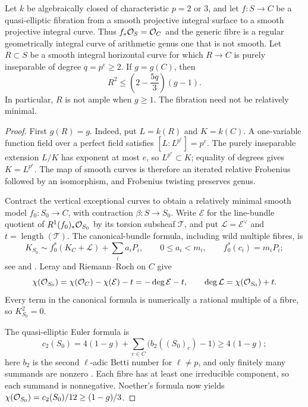\begin{proposition}\label{prop:quasielliptic-multisection}
Let $k$ be algebraically closed of characteristic $p=2$ or $3$, and let
$f:S\to C$ be a quasi-elliptic fibration from a smooth projective integral
surface to a smooth projective integral curve. Thus $f_*\mathcal O_S=\mathcal O_C$ and
the generic fibre is a regular geometrically integral curve of arithmetic
genus one that is not smooth. Let $R\subset S$ be a smooth integral
horizontal curve for which $R\to C$ is purely inseparable of degree
$q=p^e\geq2$. If $g=g(C)$, then
\[
 R^2\leq\left(2-\frac{5q}{3}\right)(g-1).
\]
In particular, $R$ is not ample when $g\geq1$. The fibration need not be
relatively minimal.
\end{proposition}
\begin{proof}
First $g(R)=g$. Indeed, put $L=k(R)$ and $K=k(C)$. A one-variable
function field over a perfect field satisfies $[L:L^{p^e}]=p^e$.
The purely inseparable extension $L/K$ has exponent at most $e$, so
$L^{p^e}\subset K$; equality of degrees gives $K=L^{p^e}$.
The map of smooth curves is therefore an iterated relative Frobenius
followed by an isomorphism, and Frobenius twisting preserves genus.

Contract the vertical exceptional curves to obtain a relatively minimal
smooth model $f_0:S_0\to C$, with contraction $\beta:S\to S_0$.
Write $\mathcal E$ for the line-bundle quotient of
$R^1(f_0)_*\mathcal O_{S_0}$ by its torsion subsheaf $\mathcal T$, and put
$\mathcal L=\mathcal E^\vee$ and $t=\operatorname{length}(\mathcal T)$.
The canonical-bundle formula, including wild multiple fibres, is
\[
 K_{S_0}\sim f_0^*(K_C+\mathcal L)+\sum_i a_iP_i,
 \qquad 0\leq a_i<m_i,\qquad f_0^*(c_i)=m_iP_i;
\]
see \cite[Theorem~5.6, author pp.~23--24]{Liedtke} and
\cite[Theorem~4.1.6, pp.~364--365]{CDL}.
Leray and Riemann--Roch on $C$ give
\[
 \chi(\mathcal O_{S_0})
 =\chi(\mathcal O_C)-\chi(\mathcal E)-t
 =-\deg\mathcal E-t,
 \qquad \deg\mathcal L=\chi(\mathcal O_{S_0})+t.
\]
Every term in the canonical formula is numerically a rational multiple
of a fibre, so $K_{S_0}^2=0$.

The quasi-elliptic Euler formula is
\[
 c_2(S_0)=4(1-g)+\sum_{c\in C}\bigl(b_2((S_0)_c)-1\bigr)
 \geq4(1-g);
\]
here $b_2$ is the second $\ell$-adic Betti number for $\ell\ne p$,
and only finitely many summands are nonzero
\cite[Corollary~4.1.12 and the preceding quasi-elliptic discussion,
p.~369]{CDL}. Each fibre has at least one irreducible component,
so each summand is nonnegative. Noether's formula now yields
$\chi(\mathcal O_{S_0})=c_2(S_0)/12\geq(1-g)/3$.


\end{proof}
